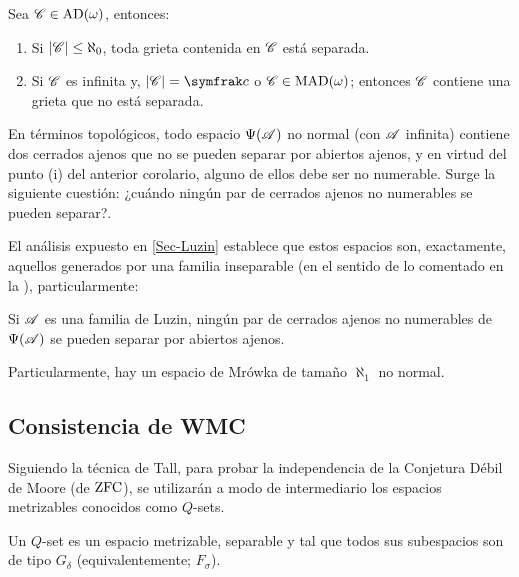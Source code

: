     \begin{corolario}\label{col-tra-interrelacion}
        Sea $\mathscr{C}\in \operatorname{AD}(\omega)$, entonces:
        \begin{enumerate}
            \item Si $|\mathscr{C}|\leq \aleph_0$, toda grieta contenida en $\mathscr{C}$ está separada.
            \item Si $\mathscr{C}$ es infinita y, $|\ms{C}|=\mathfrak{c}$ o $\mathscr{C}\in \operatorname{MAD}(\omega)$; entonces $\mathscr{C}$ contiene una grieta que no está separada.
        \end{enumerate}
    \end{corolario}

    En términos topológicos, todo espacio $\Psi(\mathscr{A})$ no normal (con $\mathscr{A}$ infinita) contiene dos cerrados ajenos que no se pueden separar por abiertos ajenos, y en virtud del punto (i) del anterior corolario, alguno de ellos debe ser no numerable. Surge la siguiente cuestión: ¿cuándo ningún par de cerrados ajenos no numerables se pueden separar?.

    El análisis expuesto en \autoref{Sec-Luzin} establece que estos espacios son, exactamente, aquellos generados por una familia inseparable (en el sentido de lo comentado en la \pageref{def-FamInseparable}), particularmente:

    \begin{corolario}\label{cor-MrowkaLuzin}
        Si $\mathscr{A}$ es una familia de Luzin, ningún par de cerrados ajenos no numerables de $\Psi(\mathscr{A})$ se pueden separar por abiertos ajenos.

        Particularmente, hay un espacio de Mrówka de tamaño $\aleph_1$ no normal.
    \end{corolario}

    \subsection{Consistencia de \textsf{WMC}}
    \label{Sec-PDM}

    Siguiendo la técnica de Tall, para probar la independencia de la Conjetura Débil de Moore (de $\operatorname{ZFC}$), se utilizarán a modo de intermediario los espacios metrizables conocidos como $Q$-sets.

    \begin{definicion}\label{def-Qset}
        Un $Q$-set es un espacio metrizable, separable y tal que todos sus subespacios son de tipo $G_\delta$ (equivalentemente; $F_\sigma$).
    \end{definicion}

